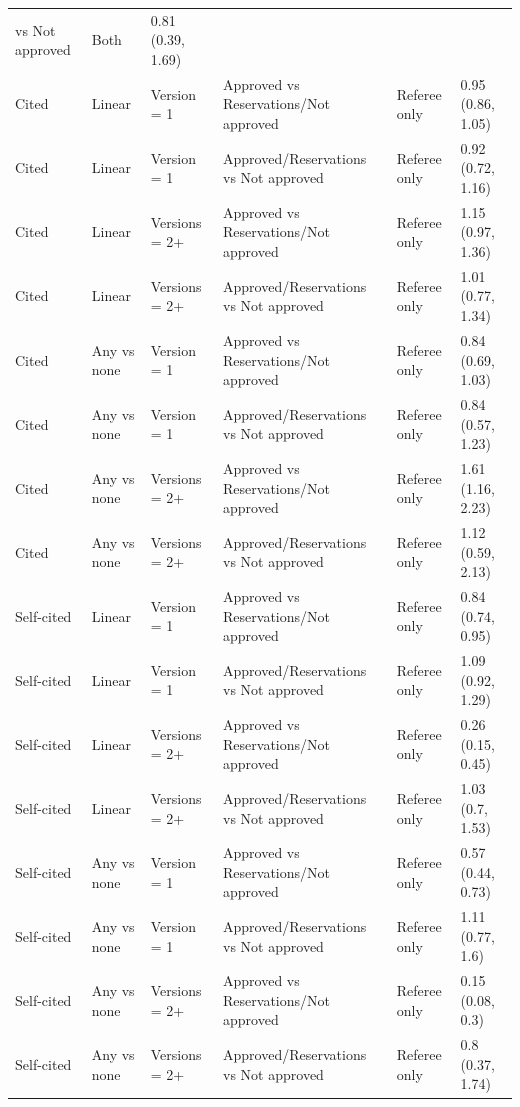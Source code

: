 \begin{table}[ht]
\begin{tabular}{llllll}
vs Not approved & Both & 0.81 (0.39, 1.69) \\ 
  Cited & Linear & Version = 1 & Approved vs
Reservations/Not approved & Referee only & 0.95 (0.86, 1.05) \\ 
  Cited & Linear & Version = 1 & Approved/Reservations
vs Not approved & Referee only & 0.92 (0.72, 1.16) \\ 
  Cited & Linear & Versions = 2+ & Approved vs
Reservations/Not approved & Referee only & 1.15 (0.97, 1.36) \\ 
  Cited & Linear & Versions = 2+ & Approved/Reservations
vs Not approved & Referee only & 1.01 (0.77, 1.34) \\ 
  Cited & Any vs none & Version = 1 & Approved vs
Reservations/Not approved & Referee only & 0.84 (0.69, 1.03) \\ 
  Cited & Any vs none & Version = 1 & Approved/Reservations
vs Not approved & Referee only & 0.84 (0.57, 1.23) \\ 
  Cited & Any vs none & Versions = 2+ & Approved vs
Reservations/Not approved & Referee only & 1.61 (1.16, 2.23) \\ 
  Cited & Any vs none & Versions = 2+ & Approved/Reservations
vs Not approved & Referee only & 1.12 (0.59, 2.13) \\ 
  Self-cited & Linear & Version = 1 & Approved vs
Reservations/Not approved & Referee only & 0.84 (0.74, 0.95) \\ 
  Self-cited & Linear & Version = 1 & Approved/Reservations
vs Not approved & Referee only & 1.09 (0.92, 1.29) \\ 
  Self-cited & Linear & Versions = 2+ & Approved vs
Reservations/Not approved & Referee only & 0.26 (0.15, 0.45) \\ 
  Self-cited & Linear & Versions = 2+ & Approved/Reservations
vs Not approved & Referee only & 1.03 (0.7, 1.53) \\ 
  Self-cited & Any vs none & Version = 1 & Approved vs
Reservations/Not approved & Referee only & 0.57 (0.44, 0.73) \\ 
  Self-cited & Any vs none & Version = 1 & Approved/Reservations
vs Not approved & Referee only & 1.11 (0.77, 1.6) \\ 
  Self-cited & Any vs none & Versions = 2+ & Approved vs
Reservations/Not approved & Referee only & 0.15 (0.08, 0.3) \\ 
  Self-cited & Any vs none & Versions = 2+ & Approved/Reservations
vs Not approved & Referee only & 0.8 (0.37, 1.74) \\ 
  \end{tabular}
\end{table}
